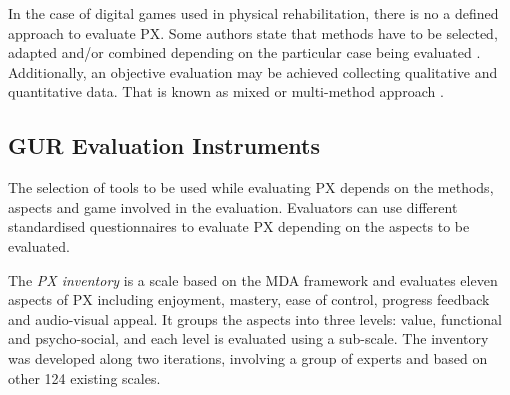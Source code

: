 
In the case of digital games used in physical rehabilitation, there is no a defined approach to evaluate \ac{PX}. Some authors state that methods have to be selected, adapted and/or combined depending on the particular case being evaluated \autocite{Yanez-Gomez2017,Wiemeyer2016,Mueller2015}. Additionally, an objective evaluation may be achieved collecting qualitative and quantitative data. That is known as mixed or multi-method approach \autocite{Nacke2009,Iacovides2015,Drachen2013,Mueller2015,Zammitto2014}.

\subsection{\ac{GUR} Evaluation Instruments}
\label{subsec:instruments}
The selection of tools to be used while evaluating \ac{PX} depends on the methods, aspects and game involved in the evaluation. Evaluators can use different standardised questionnaires to evaluate PX depending on the aspects to be evaluated.

The \textit{PX inventory} \autocite{VandenAbeele2016} is a scale based on the \ac{MDA} framework and evaluates eleven aspects of \ac{PX} including enjoyment, mastery, ease of control, progress feedback and audio-visual appeal. It groups the aspects into three levels: value, functional and psycho-social, and each level is evaluated using a sub-scale. The inventory was developed along two iterations, involving a group of experts and based on other 124 existing scales. 

